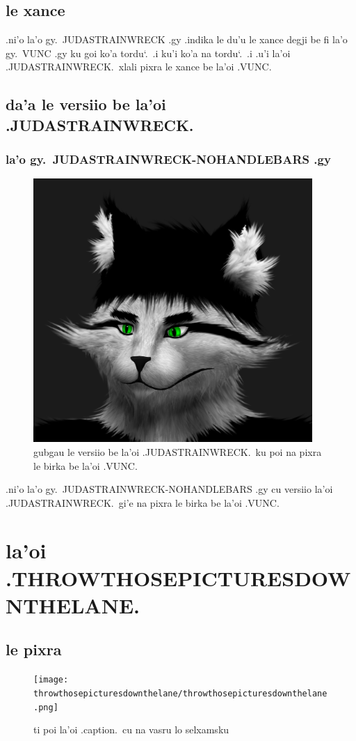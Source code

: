 \documentclass{report}
\newcommand\sds{\spacefactor\sfcode`.\ \space}
\begin{document}
\section{le xance}
.ni'o la'o gy.\ JUDASTRAINWRECK .gy .indika le du'u le xance degji be fi la'o gy.\ VUNC .gy ku goi ko'a tordu\sds  .i ku'i ko'a na tordu\sds  .i .u'i la'oi .JUDASTRAINWRECK.\ xlali pixra le xance be la'oi .VUNC.

\section{da'a le versiio be la'oi .JUDASTRAINWRECK.}

\subsection{la'o gy.\ JUDASTRAINWRECK-NOHANDLEBARS .gy}
\begin{figure}[ht]
	\centering
	\includegraphics[height=10cm]{judastrainwreck/judastrainwreck-nohandlebars.png}
	\caption[center]{gubgau le versiio be la'oi .JUDASTRAINWRECK.\ ku poi na pixra le birka be la'oi .VUNC.}
\end{figure}
.ni'o la'o gy.\ JUDASTRAINWRECK-NOHANDLEBARS .gy cu versiio la'oi .JUDASTRAINWRECK.\ gi'e na pixra le birka be la'oi .VUNC.

\chapter{la'oi .THROWTHOSEPICTURESDOWNTHELANE.}
\section{le pixra}
\begin{figure}[ht]
	\centering
	\texttt{[image: throwthosepicturesdownthelane/throwthosepicturesdownthelane.png]}
	\caption[center]{ti poi la'oi .caption.\ cu na vasru lo selxamsku}
\end{figure}
\end{document}
